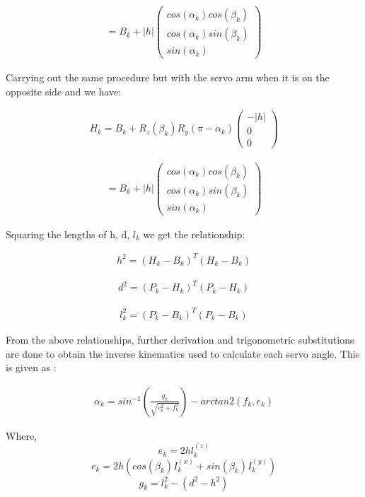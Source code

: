 \begin{ceqn}
 \begin{align}
	= B_{k} + |h|\begin{pmatrix}
	cos(\alpha_{k})cos(\beta_{k})\\
	 cos(\alpha_{k})sin(\beta_{k})\\
	  sin(\alpha_{k})
	\end{pmatrix}
	\label{eq:myeqn2}
\end{align}
\end{ceqn}
Carrying out the same procedure but with the servo arm when it is on the opposite side and we have:
\begin{ceqn}
\begin{align}
	H_{k} = B_{k} + R_{z}(\beta_{k}) R_{y}(\pi -\alpha_{k})\begin{pmatrix}
	-|h|\\ 0 \\ 0
	\end{pmatrix}
	\label{eq:myeqn2}
\end{align}
\end{ceqn}
\begin{ceqn}
	\begin{align}
	= B_{k} + |h|\begin{pmatrix}
	cos(\alpha_{k})cos(\beta_{k})\\
	 cos(\alpha_{k})sin(\beta_{k})\\
	  sin(\alpha_{k})
	\end{pmatrix}
	\label{eq:myeqn2}
\end{align}
\end{ceqn}
Squaring the lengths of h, d, $l_{k}$ we get the relationship:
\begin{ceqn}
	\begin{align}
		h^2 = (H_{k}-B_{k})^{T}(H_{k}-B_{k})
	\end{align}
\end{ceqn}
\begin{ceqn}
	\begin{align}
		d^2 = (P_{k}-H_{k})^{T}(P_{k}-H_{k})
	\end{align}
\end{ceqn}
\begin{ceqn}
	\begin{align}
		l_{k}^2 = (P_{k}-B_{k})^{T}(P_{k}-B_{k})
	\end{align}
\end{ceqn}
From the above relationships, further derivation and trigonometric substitutions are done to obtain the inverse kinematics used to calculate each servo angle. This is given as \cite{Eisele_2019}:
\begin{ceqn}
\begin{align}
	\alpha_{k} = sin^{-1}(\frac{g_{k}}{\sqrt{e_{k}^2+f_{k}^2}})-arctan2(f_{k}, e_{k})
\end{align}
\end{ceqn}
Where,
$$e_{k} = 2hl_{k}^{(z)} $$
$$e_{k} = 2h(cos(\beta_{k})I_{k}^{(x)}+sin({\beta_{k}})I_{k}^(y))$$
$$g_{k} = l_{k}^2 - (d^2 - h^2)   $$

